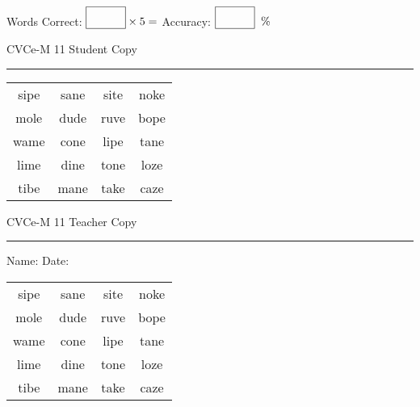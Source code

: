 \documentclass{memoir}
\begin{document}
\small

Words Correct: $\fbox{\phantom{\huge 100}} \times 5 = $ Accuracy: $\fbox{\phantom{\huge 100}}\;\; \%$ 

\vfill

\newpage


\footnotesize \noindent
CVCe-M 11 \hfill Student Copy
\smallskip
\hrule

\Large

\setlength{\tabcolsep}{14pt}
\def\arraystretch{2}

{\selectfont


\begin{vplace}[0.5]
\begin{center}
\begin{tabular}{cccc}
sipe & sane & site & noke \\
mole & dude & ruve & bope \\
wame & cone & lipe & tane \\
lime & dine & tone & loze \\
tibe & mane & take & caze \\
\end{tabular}
\end{center}
\end{vplace}

}

\newpage

\footnotesize \noindent
CVCe-M 11 \hfill Teacher Copy
\smallskip
\hrule

\small

\vfill

\noindent
Name: \underline{\hspace{1.75in}} \hfill Date: \underline{\hspace{1in}}

\Large

{\selectfont


\begin{vplace}[0.5]
\begin{center}
\begin{tabular}{cccc}
sipe & sane & site & noke \\
mole & dude & ruve & bope \\
wame & cone & lipe & tane \\
lime & dine & tone & loze \\
tibe & mane & take & caze \\
\end{tabular}
\end{center}
\end{vplace}



}
\end{document}

